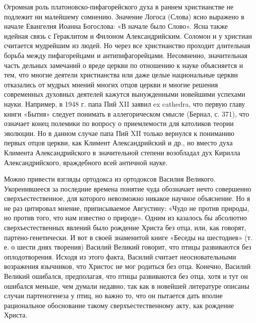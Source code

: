 Огромная роль платоновско-пифагорейского духа в раннем христианстве не подлежит
ни малейшему сомнению. Значение Логоса (Слова) ясно выражено в начале Евангелия
Иоанна Богослова: «В начале было Слово». Ясна также идейная связь с Гераклитом
и Филоном Александрийским. Соломон и у христиан считается мудрейшим из людей.
Но через все христианство проходит длительная борьба между пифагорейцами и
антипифагорейцами. Несомненно, значительная часть дельных замечаний о вреде
церкви по отношению к науке объясняется и тем, что многие деятели христианства
или даже целые национальные церкви отказались от мудрых мнений многих отцов
церкви и многие решения современных духовных деятелей кажутся вынужденными
новейшими успехами науки. Например, в 1948 г. папа Пий XII заявил ex cathedra,
что первую главу книги «Бытия» следует понимать в аллегорическом смысле
(Бернал, с. 371), что означает конец полемики по вопросу о приемлемости для
католиков теории эволюции. Но в данном случае папа Пий XII только вернулся к
пониманию первых отцов церкви, как Климент Александрийский и др., но вместо
духа Климента Александрийского в значительной степени возобладал дух Кирилла
Александрийского, враждебного всей античной науке.

Можно привести взгляды ортодокса из ортодоксов Василия Великого. Укоренившееся
за последние времена понятие чуда обозначает нечто совершенно
сверхъестественное, для которого невозможно никакое научное объяснение. Но я не
раз цитировал мнение, приписываемое Августину: «Чудо не против природы, но
против того, что нам известно о природе». Одним из казалось бы абсолютно
сверхъестественных явлений было рождение Христа без отца, или, как говорят,
партено-генетически. И вот в своей знаменитой книге «Беседы на шестоднев» (т.
е. о шести днях творения) Василий Великий говорит, что птицы развиваются без
оплодотворения. Исходя из этого факта, Василий считает неосновательными
возражения язычников, что Христос не мог родиться без отца. Конечно, Василий
Великий ошибался, предполагая, что птицы развиваются без отца, хотя и тут он
ошибался меньше, чем думали недавно, так как в новейшей литературе описаны
случаи партеногенеза у птиц, но важно то, что он пытается дать вполне
рациональное обоснование такому сверхъестественному акту, как рождение Христа.

